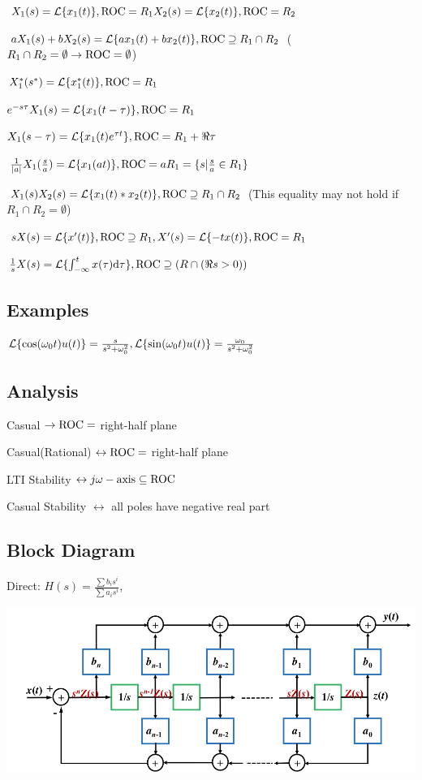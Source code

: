 $X_1(s)=\mathcal L\{ x_1(t)\},\text{ROC}=R_1 \\ X_2(s)=\mathcal L\{ x_2(t)\},\text{ROC}=R_2$

$aX_1(s) + bX_2(s) = \mathcal L\{ax_1(t) + bx_2(t)\}, \text{ROC}\supseteq R_1\cap R_2 $ 
($R_1\cap R_2=\emptyset\to \text{ROC}=\emptyset$)

$X_1^*(s^*)=\mathcal L\{x_1^*(t)\}, \text{ROC}=R_1$

$e^{-s\tau}X_1(s)=\mathcal L\{x_1(t-\tau)\}, \text{ROC}=R_1$

$X_1(s-\tau)=\mathcal L\{x_1(t)e^{\tau t}\}, \text{ROC}=R_1+\Re{\tau}$

$\frac{1}{|a|}X_1(\frac s a)=\mathcal L\{x_1(at)\}, \text{ROC}=aR_1=\{s|\frac s a \in R_1\}$

$X_1(s)X_2(s)=\mathcal L\{x_1(t) * x_2(t) \}, \text{ROC} \supseteq R_1\cap R_2$ (This equality may not hold if $R_1\cap R_2=\emptyset$)

$sX(s)=\mathcal L\{x'(t)\}, \text{ROC} \supseteq R_1, X'(s)=\mathcal L\{-tx(t)\}, \text{ROC} = R_1$

$\frac 1 sX(s)=\mathcal L\{\int_{-\infty}^t x(\tau)\mathrm{d} \tau\}, \text{ROC} \supseteq (R\cap (\Re s>0))$

\subsection*{Examples}

$\mathcal L\{\cos(\omega_0 t) u(t)\} = \frac{s}{s^2+\omega_0^2}, \mathcal L\{\sin(\omega_0 t) u(t)\} = \frac{\omega_0}{s^2+\omega_0^2}$

\subsection*{Analysis}

Casual $\to\text{ROC}=$ right-half plane

Casual(Rational) $\leftrightarrow\text{ROC}=$ right-half plane

LTI Stability $\leftrightarrow j\omega-\text{axis}\subseteq\text{ROC}$

Casual Stability $\leftrightarrow$ all poles have negative real part 

\subsection*{Block Diagram}

Direct: $H(s) = \frac{\sum b_is^i}{\sum a_is^i}$, 

\includegraphics[scale=0.25]{inhalt/direct.png}

